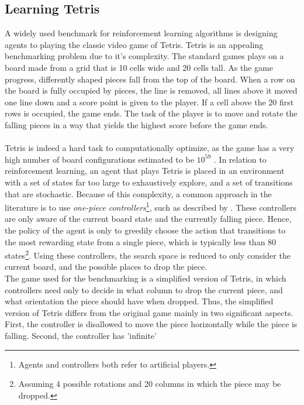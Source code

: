 \subsection{Learning Tetris \label{sec:learningTetris}}

A widely used benchmark
for reinforcement learning algorithms is designing agents 
to playing the classic video game of Tetris. Tetris is an 
appealing benchmarking problem due to it's complexity. The 
standard games plays on a board made from a grid that is
10 cells wide and 20 cells tall. As the game progress, differently
shaped pieces fall from the top of the board. 
When a row on the board is fully occupied by pieces, the line
is removed, all lines above it moved one line down and a score
point is given to the player. If a cell above the 20 first rows is
occupied, the game ends. The task of the player is to move
and rotate the falling pieces in a way that yields the highest 
score before the game ends.\\
\\
Tetris is indeed a hard task to computationally optimize, as
the game has a very high number of board configurations estimated to be
$10^{59}$ \citep{scherrer2009}. In relation to reinforcement learning,
an agent that plays Tetris is placed in an environment with a set of 
states far too large to exhaustively explore, and a set of transitions
that are stochastic. Because of this
complexity, a common approach 
in the literature is to use 
\textit{one-piece controllers}\footnote{Agents and controllers
both refer to artificial players.}, such as described by 
\cite{scherrer2009:b}. These controllers are only aware of
the current board state and the currently falling piece.
Hence, the policy of the agent is only to greedily choose
the action that transitions to the most rewarding state
from a single piece, which is typically less than 80 states\footnote{
Assuming 4 possible rotations and 20 columns
in which the piece may be dropped.}.
Using these controllers, the search space is reduced 
to only consider the current board, and the possible 
places to drop the piece. \\
The game used for the benchmarking is a simplified version of Tetris,
in which 
controllers need only to decide in what column to drop the current
piece, and what orientation the piece should have when dropped.
Thus, the simplified version of Tetris differs from the 
original game mainly in two significant aspects. 
First, the controller is 
disallowed to move the piece horizontally while the piece 
is falling. Second, the controller has 'infinite'
